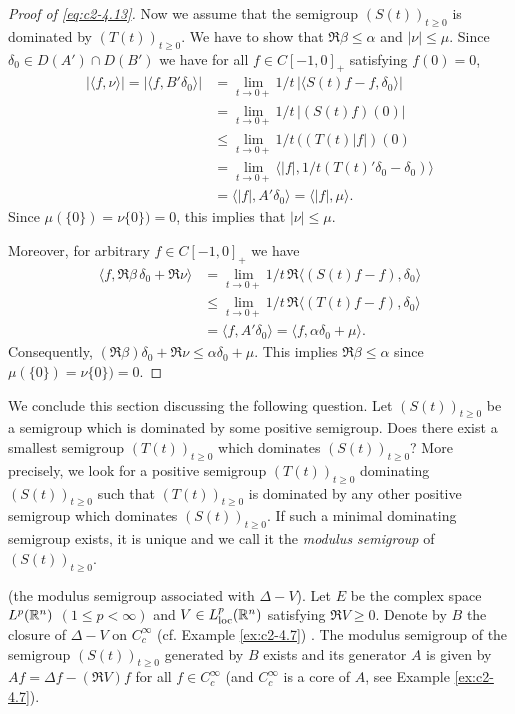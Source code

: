 \begin{proof}[Proof of \eqref{eq:c2-4.13}]
Now we assume that the semigroup $(S(t))_{t \geq 0}$ is dominated by $(T(t))_{t \geq 0}$.
We have to show that $\Re\beta \leq \alpha$ and $|\nu| \leq \mu$.
Since $\delta_{0} \in D(A') \cap D(B')$ we have for all $f \in C[-1,0]_{+}$ satisfying $f(0) = 0$,
\begin{align*}
|\langle f,\nu\rangle| = |\langle f,B'\delta_{0}\rangle| &= \lim_{t \to 0+} 1/t \, |\langle S(t)f - f , \delta_{0}\rangle|\\
&= \lim_{t \to 0+} 1/t \, |(S(t)f)(0)|  \\
&\leq \lim_{t \to 0+} 1/t \, ((T(t)|f|)(0) \\
&= \lim_{t \to 0+} \langle|f|,1/t(T(t)'\delta_{0} - \delta_{0})\rangle \\
&= \langle|f|,A'\delta_{0}\rangle = \langle|f|,\mu\rangle.
\end{align*}
Since $\mu(\{0\}) = \nu\{0\}) = 0$, this implies that $|\nu| \leq \mu$.

Moreover, for arbitrary $f \in C[-1,0]_{+}$ we have
\begin{align*}
\langle f,\Re\beta \, \delta_{0} + \Re\nu\rangle &= \lim_{t \to 0+} 1/t \, \Re\langle(S(t)f - f),\delta_{0}\rangle\\
&\leq \lim_{t \to 0+} 1/t \, \Re\langle(T(t)f - f),\delta_{0}\rangle \\
&= \langle f,A'\delta_{0}\rangle = \langle f,\alpha\delta_{0} + \mu\rangle.
\end{align*}
Consequently, $(\Re\beta)\delta_{0} + \Re\nu \leq \alpha\delta_{0} + \mu$.
This implies $\Re\beta \leq \alpha$ since $\mu(\{0\}) = \nu\{0\}) = 0$.
\end{proof}

We conclude this section discussing the following question.
Let $(S(t))_{t \geq 0}$ be a semigroup which is dominated by some positive semigroup.
Does there exist a smallest semigroup $(T(t))_{t \geq 0}$ which dominates $(S(t))_{t \geq 0}$?
More precisely, we look for a positive semigroup $(T(t))_{t \geq 0}$ dominating $(S(t))_{t \geq 0}$ such that $(T(t))_{t \geq 0}$ is dominated
by any other positive semigroup which dominates $(S(t))_{t \geq 0}$.
If such a minimal dominating semigroup exists, it is unique and we call it the
\emph{modulus semigroup} of $(S(t))_{t \geq 0}$.

\begin{example}\label{ex:c2-4.15}
(the modulus semigroup associated with $\Delta - V$).
Let $E$ be the complex space $L^{p}(\mathbb{R}^{n})$ $(1 \leq p < \infty)$ and $V \in L^{p}_{\text{loc}}(\mathbb{R}^{n})$ satisfying $\Re V \geq 0$.
Denote by $B$ the closure of $\Delta - V$ on $C^{\infty}_{c}$
(cf. Example \ref{ex:c2-4.7}) .
The modulus semigroup of the semigroup $(S(t))_{t \geq 0}$ generated by $B$ exists and its generator $A$ is given by $Af = \Delta f - (\Re V)f$ for all $f \in C^{\infty}_{c}$ (and $C^{\infty}_{c}$ is a core of $A$, see Example \ref{ex:c2-4.7}).
\end{example}

